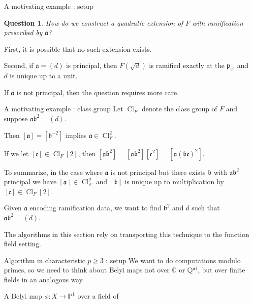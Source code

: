 \documentclass[handout,xcolor=dvipsnames]{beamer}
\theoremstyle{plain}
\newtheorem*{ques}{Question}
\newcommand{\PP}{\mathbb P}
\newcommand{\CC}{\mathbb C}
\newcommand{\QQal}{{\mathbb Q}^{\textup{al}}}
\DeclareMathOperator{\Cl}{Cl}
\begin{document}
{\begin{frame}{A motivating example : setup}
      \pause\par
      \begin{ques}
        \vspace{1pt}
        How do we construct a quadratic extension of $F$
        with ramification prescribed by $\mathfrak{a}$?
      \end{ques}
      \pause
      First, it is possible that no such extension exists.
      \pause\par
      Second, if $\mathfrak{a}=(d)$ is principal,
      then $F(\sqrt{d})$ is ramified exactly at
      the $\mathfrak{p}_v$, and $d$ is unique up
      to a unit.
      \pause\par
      If $\mathfrak{a}$ is not principal,
      then the question requires more care.
    \end{frame}
    \begin{frame}{A motivating example : class group}
      Let $\Cl_F$ denote the class group of $F$
      and suppose $\mathfrak{a}\mathfrak{b}^2=(d)$.
      \pause\par
      Then
      $[\mathfrak{a}]=[\mathfrak{b}^{-2}]$
      implies $\mathfrak{a}\in\Cl_F^2$.
      \pause\par
      If we let $[\mathfrak{c}]\in\Cl_F[2]$,
      then
      $[\mathfrak{a}\mathfrak{b}^2]
        =[\mathfrak{a}\mathfrak{b}^2][\mathfrak{c}^2]
        =[\mathfrak{a}(\mathfrak{b}\mathfrak{c})^2]$.
      \pause\par
      To summarize,
      in the case where $\mathfrak{a}$ is not principal
      but there exists $\mathfrak{b}$ with
      $\mathfrak{a}\mathfrak{b}^2$ principal
      we have
      $[\mathfrak{a}]\in\Cl_F^2$
      and $[\mathfrak{b}]$ is unique
      up to multiplication by
      $[\mathfrak{c}]\in\Cl_F[2]$.
      \pause\par
      Given $\mathfrak{a}$ encoding ramification data,
      we want to find $\mathfrak{b}^2$ and $d$
      such that $\mathfrak{a}\mathfrak{b}^2=(d)$.
      \pause\par
      The algorithms in this section
      rely on transporting this technique
      to the function field setting.
    \end{frame}
    \begin{frame}{Algorithm in characteristic $p\geq 3$ : setup}
      We want to do computations modulo primes,
      so we need to think about Belyi maps not over
      $\CC$ or $\QQal$, but over finite fields in
      an analogous way.
      \pause\par
      A Belyi map $\phi\colon X\to\PP^1$ over a field of

\end{frame}}
\end{document}
